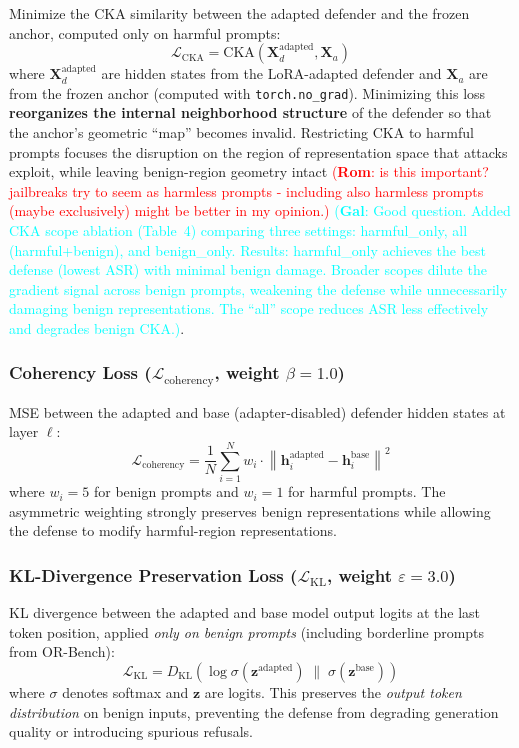 \documentclass[11pt]{article}
\newcommand\rom[1]{\textcolor{red}{(\textbf{Rom}: #1)}} %
\newcommand\gal[1]{\textcolor{cyan}{(\textbf{Gal}: #1)}} %
\newcommand{\loss}{\mathcal{L}}
\newcommand{\norm}[1]{\left\| #1 \right\|}
\begin{document}
Minimize the CKA similarity between the adapted defender and the frozen anchor, computed only on harmful prompts:
\begin{equation}
    \loss_{\text{CKA}} = \text{CKA}(\mathbf{X}_d^{\text{adapted}}, \mathbf{X}_a)
\end{equation}
where $\mathbf{X}_d^{\text{adapted}}$ are hidden states from the LoRA-adapted defender and $\mathbf{X}_a$ are from the frozen anchor (computed with \texttt{torch.no\_grad}). Minimizing this loss \textbf{reorganizes the internal neighborhood structure} of the defender so that the anchor's geometric ``map'' becomes invalid. Restricting CKA to harmful prompts focuses the disruption on the region of representation space that attacks exploit, while leaving benign-region geometry intact \rom{is this important? jailbreaks try to seem as harmless prompts - including also harmless prompts (maybe exclusively) might be better in my opinion.} \gal{Good question. Added CKA scope ablation (Table~4) comparing three settings: harmful\_only, all (harmful+benign), and benign\_only. Results: harmful\_only achieves the best defense (lowest ASR) with minimal benign damage. Broader scopes dilute the gradient signal across benign prompts, weakening the defense while unnecessarily damaging benign representations. The ``all'' scope reduces ASR less effectively and degrades benign CKA.}.

\subsubsection{Coherency Loss ($\loss_{\text{coherency}}$, weight $\beta = 1.0$)}

MSE between the adapted and base (adapter-disabled) defender hidden states at layer $\ell$:
\begin{equation}
    \loss_{\text{coherency}} = \frac{1}{N} \sum_{i=1}^{N} w_i \cdot \norm{\mathbf{h}_i^{\text{adapted}} - \mathbf{h}_i^{\text{base}}}^2
\end{equation}
where $w_i = 5$ for benign prompts and $w_i = 1$ for harmful prompts. The asymmetric weighting strongly preserves benign representations while allowing the defense to modify harmful-region representations.

\subsubsection{KL-Divergence Preservation Loss ($\loss_{\text{KL}}$, weight $\varepsilon = 3.0$)}

KL divergence between the adapted and base model output logits at the last token position, applied \emph{only on benign prompts} (including borderline prompts from OR-Bench):
\begin{equation}
    \loss_{\text{KL}} = D_{\text{KL}}\!\left(\log \sigma(\mathbf{z}^{\text{adapted}}) \;\|\; \sigma(\mathbf{z}^{\text{base}})\right)
\end{equation}
where $\sigma$ denotes softmax and $\mathbf{z}$ are logits. This preserves the \emph{output token distribution} on benign inputs, preventing the defense from degrading generation quality or introducing spurious refusals.
\end{document}
